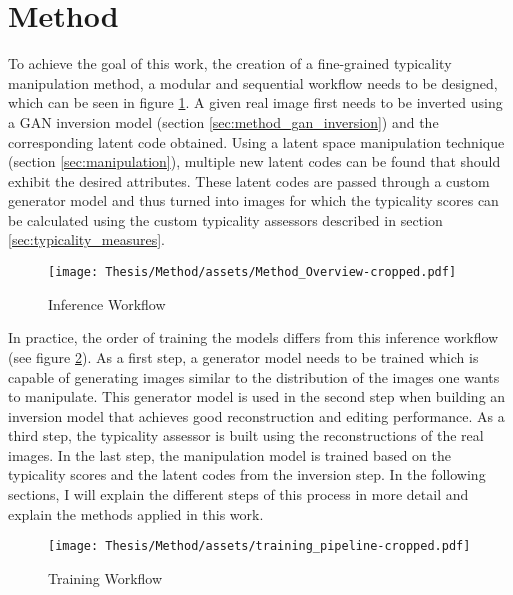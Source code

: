 \section{Method}
To achieve the goal of this work, the creation of a fine-grained typicality manipulation method, a modular and sequential workflow needs to be designed, which can be seen in figure \ref{fig:method_overview}. A given real image first needs to be inverted using a GAN inversion model (section \ref{sec:method_gan_inversion}) and the corresponding latent code obtained. Using a latent space manipulation technique (section \ref{sec:manipulation}), multiple new latent codes can be found that should exhibit the desired attributes. These latent codes are passed through a custom generator model and thus turned into images for which the typicality scores can be calculated using the custom typicality assessors described in section \ref{sec:typicality_measures}.
\begin{figure}[ht!]
    \centering
    \texttt{[image: Thesis/Method/assets/Method\_Overview-cropped.pdf]}
    \caption{Inference Workflow}
    \label{fig:method_overview}
\end{figure}
In practice, the order of training the models differs from this inference workflow (see figure \ref{fig:training_pipeline}). As a first step, a generator model needs to be trained which is capable of generating images similar to the distribution of the images one wants to manipulate. This generator model is used in the second step when building an inversion model that achieves good reconstruction and editing performance. As a third step, the typicality assessor is built using the reconstructions of the real images. In the last step, the manipulation model is trained based on the typicality scores and the latent codes from the inversion step.  In the following sections, I will explain the different steps of this process in more detail and explain the methods applied in this work.

\begin{figure}[ht!]
    \centering
    \texttt{[image: Thesis/Method/assets/training\_pipeline-cropped.pdf]}
    \caption{Training Workflow}
    \label{fig:training_pipeline}
\end{figure}



%




